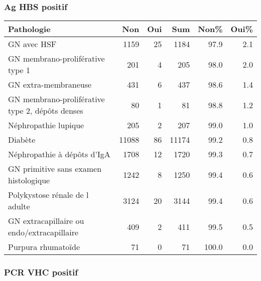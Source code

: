 \documentclass[11pt,a4paper]{article}\usepackage[]{graphicx}\usepackage[]{color}
\begin{document}
\subsubsection*{Ag HBS positif}

\begin{table}[H]
\centering
\begin{tabular}{lrrrrr}
  \hline
Pathologie & Non & Oui & Sum & Non\% & Oui\% \\ 
  \hline
GN avec HSF & 1159 & 25 & 1184 & 97.9 & 2.1 \\ 
  GN membrano-proliférative type 1 & 201 &  4 & 205 & 98.0 & 2.0 \\ 
  GN extra-membraneuse & 431 &  6 & 437 & 98.6 & 1.4 \\ 
  GN membrano-proliférative type 2, dépôts denses & 80 &  1 & 81 & 98.8 & 1.2 \\ 
  Néphropathie lupique & 205 &  2 & 207 & 99.0 & 1.0 \\ 
  Diabète & 11088 & 86 & 11174 & 99.2 & 0.8 \\ 
  Néphropathie à dépôts d'IgA & 1708 & 12 & 1720 & 99.3 & 0.7 \\ 
  GN primitive sans examen histologique & 1242 &  8 & 1250 & 99.4 & 0.6 \\ 
  Polykystose rénale de l adulte & 3124 & 20 & 3144 & 99.4 & 0.6 \\ 
  GN extracapillaire ou endo/extracapillaire & 409 &  2 & 411 & 99.5 & 0.5 \\ 
  Purpura rhumatoïde & 71 &  0 & 71 & 100.0 & 0.0 \\ 
   \hline
\end{tabular}
\end{table}


\subsubsection*{PCR VHC positif}
\end{document}
